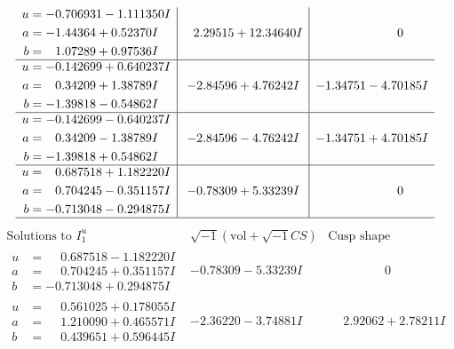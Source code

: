 \documentclass[1p]{elsarticle_modified}
\theoremstyle{definition}
\newcommand{\I}{\sqrt{-1}}
\begin{document}
$$\begin{array}{c|c|c}
\begin{aligned}
u &= -0.706931 - 1.111350 I \\
a &= -1.44364 + 0.52370 I \\
b &= \phantom{-}1.07289 + 0.97536 I\end{aligned}
 & \phantom{-}2.29515 + 12.34640 I & \phantom{-0.000000 } 0 \\ \hline\begin{aligned}
u &= -0.142699 + 0.640237 I \\
a &= \phantom{-}0.34209 + 1.38789 I \\
b &= -1.39818 - 0.54862 I\end{aligned}
 & -2.84596 + 4.76242 I & -1.34751 - 4.70185 I \\ \hline\begin{aligned}
u &= -0.142699 - 0.640237 I \\
a &= \phantom{-}0.34209 - 1.38789 I \\
b &= -1.39818 + 0.54862 I\end{aligned}
 & -2.84596 - 4.76242 I & -1.34751 + 4.70185 I \\ \hline\begin{aligned}
u &= \phantom{-}0.687518 + 1.182220 I \\
a &= \phantom{-}0.704245 - 0.351157 I \\
b &= -0.713048 - 0.294875 I\end{aligned}
 & -0.78309 + 5.33239 I & \phantom{-0.000000 } 0\\
 \hline 
 \end{array}$$\newpage$$\begin{array}{c|c|c}  
\text{Solutions to }I^u_{1}& \I (\text{vol} + \sqrt{-1}CS) & \text{Cusp shape}\\
 \hline 
\begin{aligned}
u &= \phantom{-}0.687518 - 1.182220 I \\
a &= \phantom{-}0.704245 + 0.351157 I \\
b &= -0.713048 + 0.294875 I\end{aligned}
 & -0.78309 - 5.33239 I & \phantom{-0.000000 } 0 \\ \hline\begin{aligned}
u &= \phantom{-}0.561025 + 0.178055 I \\
a &= \phantom{-}1.210090 + 0.465571 I \\
b &= \phantom{-}0.439651 + 0.596445 I\end{aligned}
 & -2.36220 - 3.74881 I & \phantom{-}2.92062 + 2.78211 I \\ \hline\begin{aligned}

\end{aligned}
\end{array}$$
\end{document}
